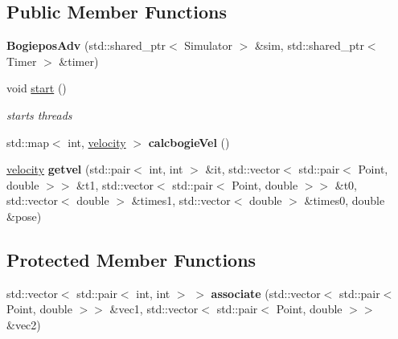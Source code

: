 \subsection*{Public Member Functions}
\begin{DoxyCompactItemize}
\item 
\mbox{\label{classBogieposAdv_a0b295babf5011077561b9bb8729f9ac2}} 
{\bfseries Bogiepos\+Adv} (std\+::shared\+\_\+ptr$<$ Simulator $>$ \&sim, std\+::shared\+\_\+ptr$<$ Timer $>$ \&timer)
\item 
\mbox{\label{classBogieposAdv_a0d2aa854b7d981dcd2aab317c6647004}} 
void \hyperlink{classBogieposAdv_a0d2aa854b7d981dcd2aab317c6647004}{start} ()
\begin{DoxyCompactList}\small\item\em starts threads \end{DoxyCompactList}\item 
\mbox{\label{classBogieposAdv_a56ebed2f7f60d2983c16154a966ed9e3}} 
std\+::map$<$ int, \hyperlink{structvelocity}{velocity} $>$ {\bfseries calcbogie\+Vel} ()
\item 
\mbox{\label{classBogieposAdv_a4854019d616648248d766bf014c56ff7}} 
\hyperlink{structvelocity}{velocity} {\bfseries getvel} (std\+::pair$<$ int, int $>$ \&it, std\+::vector$<$ std\+::pair$<$ Point, double $>$$>$ \&t1, std\+::vector$<$ std\+::pair$<$ Point, double $>$$>$ \&t0, std\+::vector$<$ double $>$ \&times1, std\+::vector$<$ double $>$ \&times0, double \&pose)
\end{DoxyCompactItemize}
\subsection*{Protected Member Functions}
\begin{DoxyCompactItemize}
\item 
\mbox{\label{classBogieposAdv_a1397ca8153862494414ff135997da59a}} 
std\+::vector$<$ std\+::pair$<$ int, int $>$ $>$ {\bfseries associate} (std\+::vector$<$ std\+::pair$<$ Point, double $>$$>$ \&vec1, std\+::vector$<$ std\+::pair$<$ Point, double $>$$>$ \&vec2)
\end{DoxyCompactItemize}
